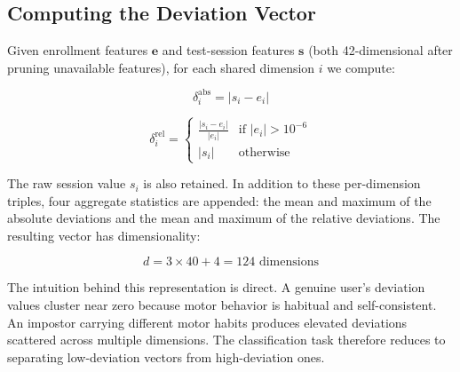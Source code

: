 \documentclass[conference]{IEEEtran}
\begin{document}
\subsection{Computing the Deviation Vector}

Given enrollment features $\mathbf{e}$ and test-session features $\mathbf{s}$ (both 42-dimensional after pruning unavailable features), for each shared dimension $i$ we compute:

\begin{equation}
\delta_i^{\text{abs}} = |s_i - e_i|
\end{equation}

\begin{equation}
\delta_i^{\text{rel}} = \begin{cases}
\frac{|s_i - e_i|}{|e_i|} & \text{if } |e_i| > 10^{-6} \\
|s_i| & \text{otherwise}
\end{cases}
\end{equation}

The raw session value $s_i$ is also retained. In addition to these per-dimension triples, four aggregate statistics are appended: the mean and maximum of the absolute deviations and the mean and maximum of the relative deviations. The resulting vector has dimensionality:

\begin{equation}
d = 3 \times 40 + 4 = 124 \text{ dimensions}
\end{equation}

The intuition behind this representation is direct. A genuine user's deviation values cluster near zero because motor behavior is habitual and self-consistent. An impostor carrying different motor habits produces elevated deviations scattered across multiple dimensions. The classification task therefore reduces to separating low-deviation vectors from high-deviation ones.
\end{document}
